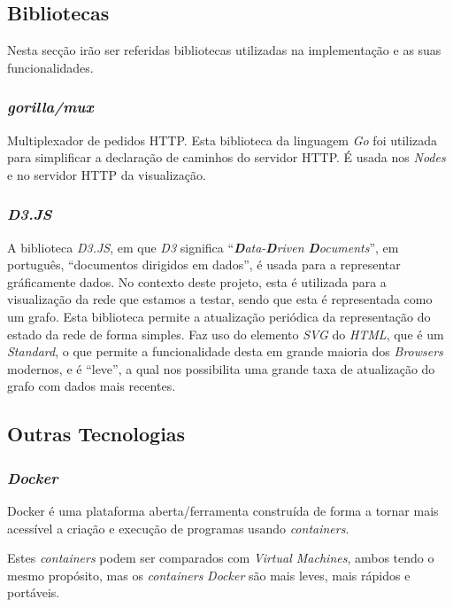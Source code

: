 \subsection*{Bibliotecas}
\label{chap3:bibliotecas}
Nesta secção irão ser referidas bibliotecas utilizadas na implementação e as suas funcionalidades.

\subsubsection*{\emph{gorilla/mux}}
Multiplexador de pedidos \acs{HTTP}. Esta biblioteca da linguagem \emph{Go} foi utilizada para simplificar a declaração de caminhos do servidor \acs{HTTP}. É usada nos \emph{Nodes} e no servidor \acs{HTTP} da visualização.

\subsubsection*{\emph{D3.JS}}
A biblioteca \emph{D3.JS}, em que \emph{D3} significa ``\emph{\textbf{D}ata-\textbf{D}riven \textbf{D}ocuments}'', em português, ``documentos dirigidos em dados'', é usada para a representar gráficamente dados.
No contexto deste projeto, esta é utilizada para a visualização da rede que estamos a testar, sendo que esta é representada como um grafo.
Esta biblioteca permite a atualização periódica da representação do estado da rede de forma simples.
Faz uso do elemento \emph{\acs{SVG}} do \emph{\acs{HTML}}, que é um \emph{Standard}, o que permite a funcionalidade desta em grande maioria dos \emph{Browsers} modernos, e é ``leve'', a qual nos possibilita uma grande taxa de atualização do grafo com dados mais recentes.

\subsection*{Outras Tecnologias}
\label{chap3:outras_tecnologias}
\subsubsection*{\emph{Docker}}

Docker é uma plataforma aberta/ferramenta construída de forma a tornar mais acessível a criação e execução de programas  usando \emph{containers}.


Estes \emph{containers} podem ser comparados com \emph{Virtual Machines}, ambos tendo o mesmo propósito, mas os \emph{containers} \emph{Docker} são mais leves, mais rápidos e portáveis.


